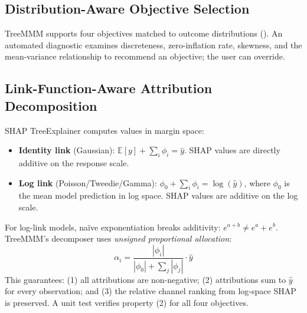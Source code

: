 \documentclass[review,12pt]{elsarticle}
\begin{document}
\subsection{Distribution-Aware Objective Selection}
\label{sec:methods:objective}

TreeMMM supports four objectives matched to outcome distributions
(). An automated diagnostic examines discreteness,
zero-inflation rate, skewness, and the mean-variance relationship to recommend
an objective; the user can override.

\begin{table}[ht]
\centering
\caption{Outcome distributions and corresponding TreeMMM objectives.}
\label{tab:objectives}
\end{table}

\subsection{Link-Function-Aware Attribution Decomposition}
\label{sec:methods:decomp}

SHAP TreeExplainer \cite{lundberg2020trees} computes values in margin space:

\begin{itemize}
\item \textbf{Identity link} (Gaussian): $\mathbb{E}[y] + \sum_i \phi_i = \hat{y}$.
  SHAP values are directly additive on the response scale.
\item \textbf{Log link} (Poisson/Tweedie/Gamma): $\phi_0 + \sum_i \phi_i = \log(\hat{y})$,
  where $\phi_0$ is the mean model prediction in log space. SHAP values are
  additive on the log scale.
\end{itemize}

For log-link models, na\"{i}ve exponentiation breaks additivity:
$e^{a+b} \neq e^a + e^b$. TreeMMM's decomposer uses \emph{unsigned proportional
allocation}:
\begin{equation}
\label{eq:attribution}
  \alpha_i = \frac{|\phi_i|}{|\phi_0| + \sum_j |\phi_j|} \cdot \hat{y}
\end{equation}
This guarantees: (1) all attributions are non-negative; (2) attributions sum to
$\hat{y}$ for every observation; and (3) the relative channel ranking from
log-space SHAP is preserved. A unit test verifies property (2) for all four
objectives.
\end{document}
